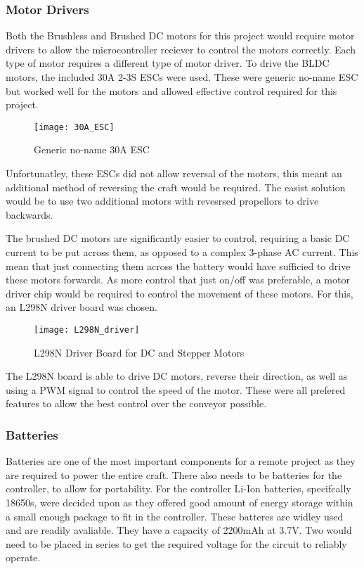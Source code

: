 \documentclass [11pt]{article}
\begin{document}
\subsubsection{Motor Drivers}


Both the Brushless and Brushed DC motors for this project would require motor drivers to allow the microcontroller reciever to control the motors correctly. Each type of motor requires a different type of motor driver. To drive the BLDC motors, the included 30A 2-3S ESCs were used. These were generic no-name ESC but worked well for the motors and allowed effective control required for this project. 

\begin{figure}[H]
\centerline{\texttt{[image: 30A\_ESC]}}
\caption{Generic no-name 30A ESC}
\label{fig:30A_ESC}
\end{figure}

Unfortunatley, these ESCs did not allow reversal of the motors, this meant an additional method of reversing the craft would be required. The easist solution would be to use two additional motors with revesrsed propellors to drive backwards.

The brushed DC motors are significantly easier to control, requiring a basic DC current to be put across them, as opposed to a complex 3-phase AC current. This mean that just connecting them across the battery would have sufficied to drive these motors forwards. As more control that just on/off was preferable, a motor driver chip would be required to control the movement of these motors. For this, an L298N driver board was chosen. 

\begin{figure}[H]
\centerline{\texttt{[image: L298N\_driver]}}
\caption{L298N Driver Board for DC and Stepper Motors}
\label{fig:L298N_driver}
\end{figure}

The L298N board is able to drive DC motors, reverse their direction, as well as using a PWM signal to control the speed of the motor. These were all prefered features to allow the best control over the conveyor possible. 

\subsubsection{Batteries}

Batteries are one of the most important components for a remote project as they are required to power the entire craft. There also needs to be batteries for the controller, to allow for portability. For the controller Li-Ion batteries, specifcally 18650s, were decided upon as they offered good amount of energy storage within a small enough package to fit in the controller. These batteres are widley used and are readily avaliable. They have a capacity of 2200mAh at 3.7V. Two would need to be placed in series to get the required voltage for the circuit to reliably operate. 
\end{document}
